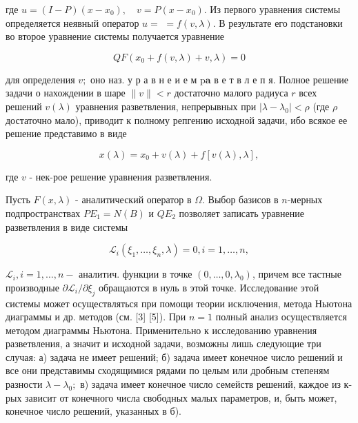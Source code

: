 \documentclass[10pt]{article}
\begin{document}
где $u=(I-P)\left(x-x_{0}\right), \quad v=P\left(x-x_{0}\right)$. Из первого уравнения системы определяется неявный оператор $u=$ $=f(v, \lambda)$. В результате его подстановки во второе уравнение системы получается уравнение



\[

Q F\left(x_{0}+f(v, \lambda)+v, \lambda\right)=0

\]



для определения $v ;$ оно наз. у р а в н е и е м $\mathrm{p} \mathbf{a}$ в е т в л е п я. Полное решение задачи о нахождении в шаре $\|v\|<r$ достаточно малого радиуса $r$ всех решений $v(\lambda)$ уравнения разветвления, непрерывных при $\left|\lambda-\lambda_{0}\right|<\rho$ (где $\rho$ достаточно мало), приводит к полному репгению исходной задачи, ибо всякое ее решение представимо в виде



\[

x(\lambda)=x_{0}+v(\lambda)+f[v(\lambda), \lambda],

\]



где $v$ - нек-рое решение уравнения разветвления.



Пусть $F(x, \lambda)$ - аналитический оператор в $\Omega$. Выбор базисов в $n$-мерных подпространствах $P E_{1}=N(B)$ и $Q E_{2}$ позволяет записать уравнение разветвления в виде системы



\[

\mathscr{L}_{i}\left(\xi_{1}, \ldots, \xi_{n}, \lambda\right)=0, i=1, \ldots, n,

\]



$\mathscr{L}_{i}, i=1, \ldots, n-$ аналитич. функции в точке $\left(0, \ldots, 0, \lambda_{0}\right)$, причем все тастные производные $\partial \mathscr{L}_{i} / \partial \xi_{j}$ обращаются в нуль в этой точке. Исследование этой системы может осуществляться при помощи теории исключения, метода Ньютона диаграммы и др. методов (см. [3] [5]). При $n=1$ полный анализ осуществляется методом диаграммы Ньютона. Применительно к исследованию уравнения разветвления, а значит и исходной задачи, возможны лишь следующие три случая: а) задача не имеет решений; б) задача имеет конечное число решений и все они представимы сходящимися рядами по целым или дробным степеням разности $\lambda-\lambda_{0} ;$ в) задача имеет конечное число семейств решений, каждое из к-рых зависит от конечного числа свободных малых параметров, и, быть может, конечное число решений, указанных в б).
\end{document}
